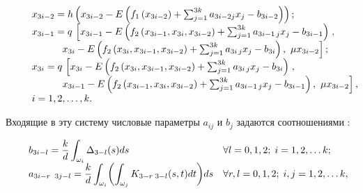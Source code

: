 \begin{equation} 

\label{GrindEQ__6_} 

\begin{array}{l} 

{x_{3i-2} =h\left(x_{3i-2} -E\left(f_{1} \left(x_{3i-2} \right)+\sum _{j=1}^{3k}a_{3i-2j} x_{j}  -b_{3i-2} \right)\right);} 

\\ 

{x_{3i-1} =q\, \left[x_{3i-1} -E\left(f_{2} \left(x_{3i-1} ,x_{3i} ,x_{3i-2} \right)+\sum _{j=1}^{3k}a_{3i-1\, j} x_{j}  -b_{3i-1} \right)\right.,} 

\\ 

\hspace{1cm} {\left. \, x_{3i} -E\left(f_{2} \left(x_{3i} ,x_{3i-1} ,x_{3i-2} \right)+\sum _{j=1}^{3k}a_{3i\, j} x_{j}  -b_{3i} \right),\, \, \mu  x_{3i-2} \right];} 

\\ 

{x_{3i} =q\, \left[x_{3i} -E\left(f_{2} \left(x_{3i} ,x_{3i-1} ,x_{3i-2} \right)+\sum _{j=1}^{3k}a_{3i\, j} x_{j}  -b_{3i} \right)\right.,} 

\\ 

\hspace{1cm} { \left. \, x_{3i-1} -E\left(f_{2} \left(x_{3i-1} ,x_{3i} ,x_{3i-2} \right)+\sum _{j=1}^{3k}a_{3i-1\, j} x_{j}  -b_{3i-1} \right),\, \, \mu  x_{3i-2} \right],} 

\\ 

i=1, 2, \dots, k. 

\end{array} \hspace{-1cm}

\end{equation}

Входящие в эту систему числовые параметры $a_{i  j} $ и $b_{j} $ задаются соотношениями \cite{al:bib19}:

\begin{equation} 

\label{GrindEQ__7_} 

\begin{array}{ll} 

\displaystyle

b_{3i-l} =\frac{k}{d} \int _{\omega _{i} }\Delta _{3-l} (s )ds & \forall l=0, 1, 2; \; i= 1, 2, \dots k ;

\\[2mm]

\displaystyle

a_{3i-r\; \; 3j-l} =\frac{k}{d} \int _{\omega _{i} }\biggl(\int _{\omega _{j} }K_{3-r\;  3-l}  (s, t)dt

\biggr)ds  & \forall r, l=0, 1, 2;\;  i, j= 1, 2, \dots k ,

\end{array} \hspace{-.5cm}

\end{equation}

